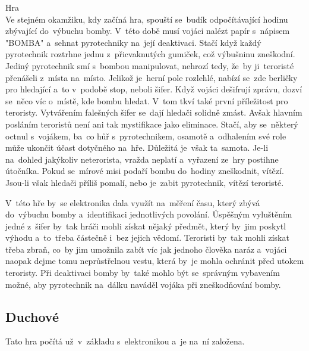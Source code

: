 \newpage
Hra\vspace{2mm}\\
Ve stejném okamžiku, kdy začíná hra, spouští se~budík odpočítávající hodinu zbývající do~výbuchu bomby. 
V~této době musí vojáci nalézt papír s~nápisem "BOMBA" a~sehnat pyrotechniky na~její deaktivaci. 
Stačí když každý pyrotechnik roztrhne jednu z~přicvaknutých gumiček, což výbušninu zneškodní. 
Jediný pyrotechnik smí s~bombou manipulovat, nehrozí tedy, že~by ji~teroristé přenášeli z~místa na~místo.
Jelikož je~herní pole rozlehlé, nabízí se~zde berličky pro hledající a~to v~podobě stop, neboli šifer. 
Když vojáci dešifrují zprávu, dozví se~něco víc o~místě, kde bombu hledat. 
V~tom tkví také první příležitost pro teroristy. 
Vytvářením falešných šifer se~dají hledači solidně zmást.
Avšak hlavním posláním teroristů není ani tak mystifikace jako eliminace. 
Stačí, aby se~některý octnul s~vojákem, ba~co hůř s~pyrotechnikem, osamotě a~odhalením své role může ukončit účast dotyčného na~hře. 
Důležitá je~však ta~samota.
Je-li na~dohled jakýkoliv neterorista, vražda neplatí a~vyřazení ze~hry postihne útočníka.
Pokud se~mírové misi podaří bombu do~hodiny zneškodnit, vítězí. 
Jsou-li však hledači příliš pomalí, nebo je~zabit pyrotechnik, vítězí teroristé.

V~této hře by~se elektronika dala využít na~měření času, který zbývá do~výbuchu bomby a~identifikaci jednotlivých povolání.
Úspěšným vyluštěním jedné z~šifer by~tak hráči mohli získat nějaký předmět, který by~jim poskytl výhodu a~to~třeba částečně i~bez jejich vědomí.
Teroristi by~tak mohli získat třeba zbraň, co~by jim umožnila zabít víc jak jednoho člověka naráz a~vojáci naopak dejme tomu neprůstřelnou vestu, která by~je mohla ochránit před utokem teroristy.
Při deaktivaci bomby by~také mohlo být se~správným vybavením možné, aby pyrotechnik na~dálku naváděl vojáka při zneškodňování bomby.

\vspace{-2mm}
\subsection{Duchové}
Tato hra počítá už~v~základu s~elektronikou a~je na~ní založena.

